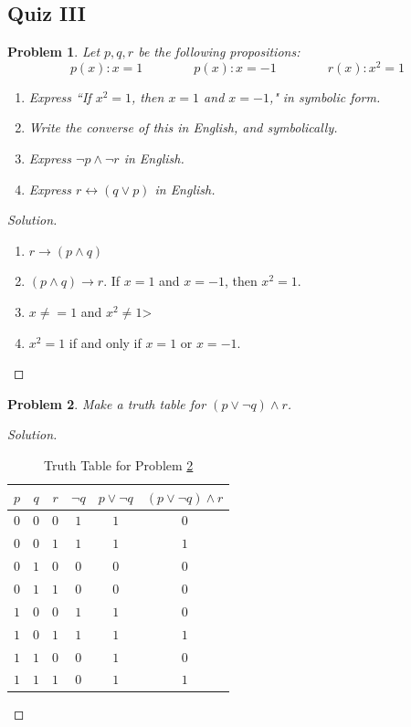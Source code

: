 \documentclass[oneside]{book}
\theoremstyle{mystyle}
\newtheorem{problem}{Problem}[section]
\begin{document}
\subsection{Quiz III}
\begin{problem}
Let $p,q,r$ be the following propositions:
\begin{equation*}
    p(x): x = 1 \quad\quad\quad\quad p(x): x = -1 \quad\quad\quad\quad r(x): x^2 = 1
\end{equation*}
\begin{enumerate}
    \item Express ``If $x^2 = 1$, then $x=1$ and $x=-1$," in symbolic form.
    \item Write the converse of this in English, and symbolically.
    \item Express $\neg p \land \neg r$ in English.
    \item Express $r\leftrightarrow (q\lor p)$ in English.
\end{enumerate}
\end{problem}
\begin{proof}[Solution]
\
\begin{enumerate}
    \item $r\rightarrow (p\land q)$
    \item $(p\land q) \rightarrow r$. If $x=1$ and $x=-1$, then $x^2 = 1$.
    \item $x\ne = 1$ and $x^2 \ne 1$>
    \item $x^2 = 1$ if and only if $x=1$ or $x=-1$.
\end{enumerate}
\end{proof}
\begin{problem}
\label{discrete_structures_quiz_3_problem_2}
Make a truth table for $(p\lor \neg q)\land r$.
\end{problem}
\begin{proof}[Solution]
\
\begin{table}[H]
    \centering
    \begin{tabular}{c c c c c c}
        \hline
        $p$ & $q$ & $r$ & $\neg q$ & $p\lor \neg q$ & $(p\lor \neg q)\land r$ \\ [0.5ex]
        \hline
        $0$ & $0$ & $0$ & $1$ & $1$ & $0$\\
        $0$ & $0$ & $1$ & $1$ & $1$ & $1$\\
        $0$ & $1$ & $0$ & $0$ & $0$ & $0$\\
        $0$ & $1$ & $1$ & $0$ & $0$ & $0$\\
        $1$ & $0$ & $0$ & $1$ & $1$ & $0$\\
        $1$ & $0$ & $1$ & $1$ & $1$ & $1$\\
        $1$ & $1$ & $0$ & $0$ & $1$ & $0$\\
        $1$ & $1$ & $1$ & $0$ & $1$ & $1$\\
        \hline
    \end{tabular}
    \caption{Truth Table for Problem \ref{discrete_structures_quiz_3_problem_2}}
    \label{tab:discrete_structures_final_exam_problem}
\end{table}
\end{proof}
\end{document}
